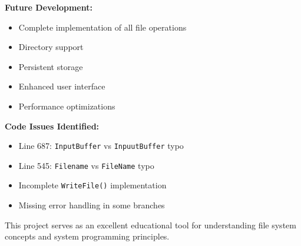 \documentclass[11pt,a4paper]{article}
\begin{document}
\textbf{Future Development:}
\begin{itemize}
    \item Complete implementation of all file operations
    \item Directory support
    \item Persistent storage
    \item Enhanced user interface
    \item Performance optimizations
\end{itemize}

\textbf{Code Issues Identified:}
\begin{itemize}
    \item Line 687: \texttt{InputBuffer} vs \texttt{InpuutBuffer} typo
    \item Line 545: \texttt{Filename} vs \texttt{FileName} typo
    \item Incomplete \texttt{WriteFile()} implementation
    \item Missing error handling in some branches
\end{itemize}

This project serves as an excellent educational tool for understanding file system concepts and system programming principles.
\end{document}
